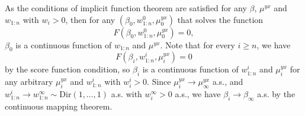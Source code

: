 \documentclass[11pt,a4paper]{article}
\theoremstyle{plain}
\theoremstyle{remark}
\theoremstyle{remark}
\begin{document}
As the conditions of implicit function theorem are satisfied for any $\beta$, $\mu^{yx}$ and $w_{1:n}$ with $w_i>0$, then for any $(\beta_0,w^0_{1:n},\mu^{yx}_0)$ that solves the function $$F(\beta_0,w^0_{1:n},\mu^{yx}_0)=0,$$ $\beta_0$ is a continuous function of $w_{1:n}$ and $\mu^{yx}$.  Note that for every $i\geq n$, we have $$F(\beta_i, w^i_{1:n}, \mu^{yx}_i)=0$$ by the score function condition, so $\beta_i$ is a continuous function of $w^i_{1:n}$ and $\mu^{yx}_i$ for any arbitrary $\mu^{yx}_i$ and $w^i_{1:n}$ with $w^i_i>0$. Since $\mu_i^{yx} \to \mu_\infty^{yx}$ a.s., and $w_{1:n}^i \to w^\infty_{1:n}\sim \text{Dir}(1,\ldots,1)$ a.s. with $w^\infty_i>0$ a.s., we have $\beta_i \to \beta_\infty$ a.s. by the continuous mapping theorem.
\end{document}
